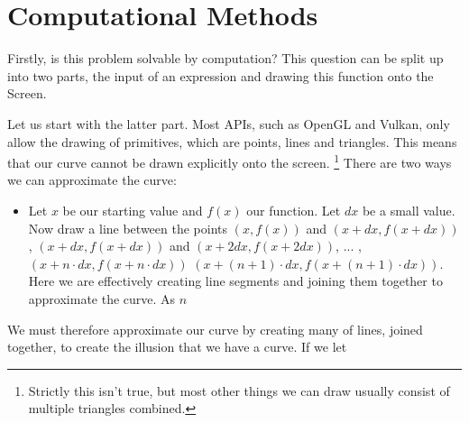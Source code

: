 \documentclass[../../../main.tex]{subfiles}
\begin{document}
\chapter{Computational Methods}
Firstly, is this problem solvable by computation? This question can be split up into two parts, the input of an expression and drawing this function onto the Screen. 

Let us start with the latter part. Most APIs, such as OpenGL and Vulkan, only allow the drawing of primitives, which are points, lines and triangles. This means that our curve cannot be drawn explicitly onto the screen.
\footnote{Strictly this isn't true, but most other things we can draw usually consist of multiple triangles combined.} 
There are two ways we can approximate the curve:
\begin{itemize} 
\item Let $x$ be our starting value and $f(x)$ our function. Let $dx$ be a small value. Now draw a line between the points $(x,f(x))$ and $(x+dx,f(x+dx))$, $(x+dx,f(x+dx))$ and $(x+2dx,f(x+2dx))$, ... , $(x+n\cdot dx,f(x+n\cdot dx))$ $(x+(n+1)\cdot dx,f(x+(n+1)\cdot dx))$. Here we are effectively creating line segments and joining them together to approximate the curve. As $n$
\end{itemize} 

We must therefore approximate our curve by creating many of lines, joined together, to create the illusion that we have a curve. If we let
\end{document}
